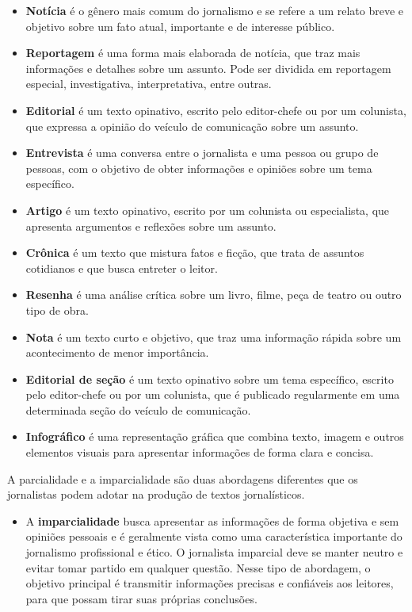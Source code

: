 {\begin{itemize}
\item \textbf{Notícia} é o gênero mais comum do jornalismo e se refere a um relato
breve e objetivo sobre um fato atual, importante e de interesse público.
\item \textbf{Reportagem} é uma forma mais elaborada de notícia, que traz mais
informações e detalhes sobre um assunto. Pode ser dividida em reportagem
especial, investigativa, interpretativa, entre outras.
\item \textbf{Editorial} é um texto opinativo, escrito pelo editor-chefe ou por um
colunista, que expressa a opinião do veículo de comunicação sobre um
assunto.
\item \textbf{Entrevista} é uma conversa entre o jornalista e uma pessoa ou grupo
de pessoas, com o objetivo de obter informações e opiniões sobre um tema
específico.
\item \textbf{Artigo} é um texto opinativo, escrito por um colunista ou
especialista, que apresenta argumentos e reflexões sobre um assunto.
\item \textbf{Crônica} é um texto que mistura fatos e ficção, que trata de
assuntos cotidianos e que busca entreter o leitor.
\item \textbf{Resenha} é uma análise crítica sobre um livro, filme, peça de teatro
ou outro tipo de obra.
\item \textbf{Nota} é um texto curto e objetivo, que traz uma informação rápida
sobre um acontecimento de menor importância.
\item \textbf{Editorial de seção} é um texto opinativo sobre um tema específico,
escrito pelo editor-chefe ou por um colunista, que é publicado
regularmente em uma determinada seção do veículo de comunicação.
\item \textbf{Infográfico} é uma representação gráfica que combina texto, imagem e
outros elementos visuais para apresentar informações de forma clara e
concisa.
\end{itemize}

A parcialidade e a imparcialidade são duas abordagens diferentes que os
jornalistas podem adotar na produção de textos jornalísticos.

\begin{itemize}
\item A \textbf{imparcialidade} busca apresentar as informações de forma objetiva e
sem opiniões pessoais e é geralmente vista como uma característica
importante do jornalismo profissional e ético. O jornalista imparcial
deve se manter neutro e evitar tomar partido em qualquer questão. Nesse
tipo de abordagem, o objetivo principal é transmitir informações
precisas e confiáveis aos leitores, para que possam tirar suas próprias
conclusões.


\end{itemize}}
